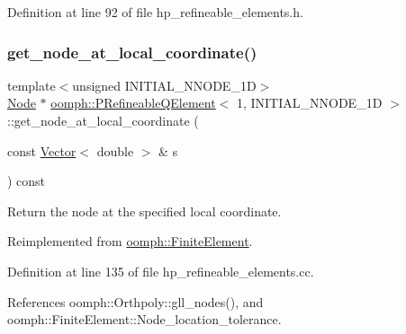 Definition at line 92 of file hp\+\_\+refineable\+\_\+elements.\+h.

\mbox{\label{classoomph_1_1PRefineableQElement_3_011_00_01INITIAL__NNODE__1D_01_4_a01b2cc99002e2f6f4bd12383831ad0b7}} 
\subsubsection{\texorpdfstring{get\+\_\+node\+\_\+at\+\_\+local\+\_\+coordinate()}{get\_node\_at\_local\_coordinate()}}
{\footnotesize\ttfamily template$<$unsigned I\+N\+I\+T\+I\+A\+L\+\_\+\+N\+N\+O\+D\+E\+\_\+1D$>$ \\
\hyperlink{classoomph_1_1Node}{Node} $\ast$ \hyperlink{classoomph_1_1PRefineableQElement}{oomph\+::\+P\+Refineable\+Q\+Element}$<$ 1, I\+N\+I\+T\+I\+A\+L\+\_\+\+N\+N\+O\+D\+E\+\_\+1D $>$\+::get\+\_\+node\+\_\+at\+\_\+local\+\_\+coordinate (\begin{DoxyParamCaption}\item[{const \hyperlink{classoomph_1_1Vector}{Vector}$<$ double $>$ \&}]{s }\end{DoxyParamCaption}) const\hspace{0.3cm}{\ttfamily [virtual]}}



Return the node at the specified local coordinate. 



Reimplemented from \hyperlink{classoomph_1_1FiniteElement_a2ddbb05c5f8bb35b64bec287d653105c}{oomph\+::\+Finite\+Element}.



Definition at line 135 of file hp\+\_\+refineable\+\_\+elements.\+cc.



References oomph\+::\+Orthpoly\+::gll\+\_\+nodes(), and oomph\+::\+Finite\+Element\+::\+Node\+\_\+location\+\_\+tolerance.




